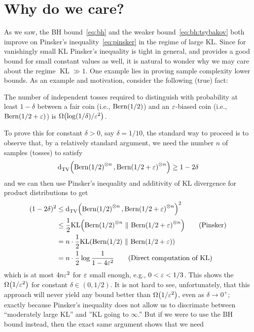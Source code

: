 \documentclass[10pt]{article}
\newcommand{\ns}{n}
\begin{document}
\section{Why do we care?}
  \label{sec:applications}
As we saw, the BH bound~\eqref{eq:bh} and the weaker bound~\eqref{eq:bh:tsybakov} both improve on Pinsker's inequality~\eqref{eq:pinsker} in the regime of large KL. Since for vanishingly small KL Pinsker's inequality is tight in general, and provides a good bound for small constant values as well, it is natural to wonder why we may care about the regime $\operatorname{KL}\gg 1$. One example lies in proving sample complexity lower bounds. As an example and motivation, consider the following (true) fact:
\begin{fact}
  \label{fact:test:bernoulli}
  The number of independent tosses required to distinguish with probability at least $1-\delta$ between a fair coin (i.e., $\operatorname{Bern}\!\left( 1/2 \right)$) and an $\varepsilon$-biased coin (i.e., $\operatorname{Bern}\!\left( 1/2+\varepsilon \right)$) is $\bigOmega{\log(1/\delta)/\eps^2}$.
\end{fact}
To prove this for constant $\delta>0$, say $\delta=1/10$, the standard way to proceed is to observe that, by a relatively standard argument, we need the number $\ns$ of samples (tosses) to satisfy
\begin{equation}
    \totalvardist{\bernoulli{1/2}^{\otimes\ns}}{\bernoulli{1/2+\eps}^{\otimes\ns}} \geq 1-2\delta
\end{equation}
and we can then use Pinsker's inequality and additivity of KL divergence for product distributions to get
\begin{align*}
    (1-2\delta)^2 
    &\leq \totalvardist{\bernoulli{1/2}^{\otimes\ns}}{\bernoulli{1/2+\eps}^{\otimes\ns}}^2    \\
    &\leq \frac{1}{2}\kldiv{\bernoulli{1/2}^{\otimes\ns}}{\bernoulli{1/2+\eps}^{\otimes\ns}}  \tag{Pinsker}\\
    &= \ns\cdot \frac{1}{2}\kldiv{\bernoulli{1/2}}{\bernoulli{1/2+\eps}}  \\
    &= \ns\cdot \frac{1}{2}\log\frac{1}{1-4\eps^2}  \tag{Direct computation of KL}
\end{align*}
which is at most $4\ns\eps^2$ for $\varepsilon$ small enough, e.g., $0<\varepsilon<1/3$. This shows the $\bigOmega{1/\eps^2}$ for constant $\delta\in(0,1/2)$. It is not hard to see, unfortunately, that this approach will never yield any bound better than $\bigOmega{1/\eps^2}$, even as $\delta\to 0^+$; exactly because Pinsker's inequality does not allow us to discrimate between ``moderately large KL'' and ''KL going to $\infty$.'' But if we were to use the BH bound instead, then the exact same argument shows that we need
\end{document}
